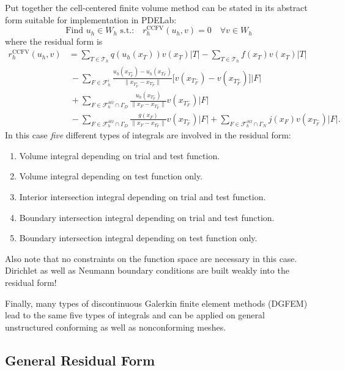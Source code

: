 \documentclass[a4paper,12pt]{article}
\begin{document}
Put together the cell-centered finite volume method can be stated
in its abstract form suitable for implementation in PDELab:
\begin{equation}
\boxed{ \text{Find $u_h\in W_h$ s.t.:} \quad r_h^{\text{CCFV}}(u_h,v) = 0 \quad \forall v \in W_h }
\end{equation}
where the residual form is
\begin{equation}
\label{eq:res_form_final}
\begin{split}
r_h^{\text{CCFV}}(u_h,v)
& = \sum_{T\in\mathcal{T}_h} q(u_h(x_T)) v(x_T) |T|
- \sum_{T\in\mathcal{T}_h} f(x_T) v(x_T) |T|\\
&\ - \sum_{F\in\mathcal{F}_h^i}
\frac{u_h(x_{T_F^+})-u_h(x_{T_F^-})}{\|x_{T_F^+} - x_{T_F^-}\|}
\bigl[v(x_{T_F^-}) - v(x_{T_F^+})\bigr] |F|\\
&\ + \sum_{F\in\mathcal{F}_h^{\partial\Omega}\cap\Gamma_D}
\frac{u_h(x_{T_F^-})}{\|x_{F} - x_{T_F^-}\|} v(x_{T_F^-}) |F| \\
&\ - \sum_{F\in\mathcal{F}_h^{\partial\Omega}\cap\Gamma_D}
\frac{g(x_{F})}{\|x_{F} - x_{T_F^-}\|} v(x_{T_F^-}) |F|
+ \sum_{F\in\mathcal{F}_h^{\partial\Omega}\cap\Gamma_N} j(x_{F}) v(x_{T_F^-}) |F| .
\end{split}
\end{equation}
In this case \textit{five} different types of integrals are involved in the
residual form:
\begin{enumerate}
\item Volume integral depending on trial and test function.
\item Volume integral depending on test function only.
\item Interior intersection integral depending on trial and test function.
\item Boundary intersection integral depending on trial and test function.
\item Boundary intersection integral depending on test function only.
\end{enumerate}
Also note that no constraints on the function space are necessary in this case.
Dirichlet as well as Neumann boundary conditions are built weakly into the
residual form!

Finally, many types of discontinuous Galerkin finite element methods (DGFEM)
lead to the same five types of integrals and can be applied on general unstructured
conforming as well as nonconforming meshes.

\subsection*{General Residual Form}
\end{document}
